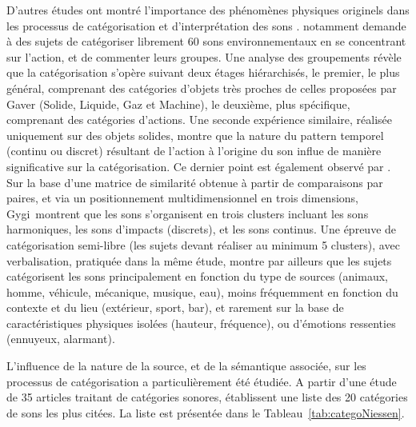 D'autres études ont montré l'importance des phénomènes physiques originels dans les processus de catégorisation et d'interprétation des sons \citep{marcell2000confrontation,lemaitre2010listener}. \citep{houix_lexical_2012} notamment demande à des sujets de catégoriser librement 60 sons environnementaux en se concentrant sur l'action, et de commenter leurs groupes. Une analyse des groupements révèle que la catégorisation s'opère suivant deux étages hiérarchisés, le premier, le plus général, comprenant des catégories d'objets très proches de celles proposées par Gaver (Solide, Liquide, Gaz et Machine), le deuxième, plus spécifique, comprenant des catégories d'actions. Une seconde expérience similaire, réalisée uniquement sur des objets solides, montre que la nature du pattern temporel (continu ou discret) résultant de l'action à l'origine du son influe de manière significative sur la catégorisation. Ce dernier point est également observé par \citep{gygi2007similarity}. Sur la base d'une matrice de similarité obtenue à partir de comparaisons par paires, et via un positionnement multidimensionnel en trois dimensions, Gygi~\al montrent que les sons s'organisent en trois clusters incluant les sons harmoniques, les sons d'impacts (discrets), et les sons continus. Une épreuve de catégorisation semi-libre (les sujets devant réaliser au minimum 5 clusters), avec verbalisation, pratiquée dans la même étude, montre par ailleurs que les sujets catégorisent les sons principalement en fonction du type de sources (animaux, homme, véhicule, mécanique, musique, eau), moins fréquemment en fonction du contexte et du lieu (extérieur, sport, bar), et rarement sur la base de caractéristiques physiques isolées (hauteur, fréquence), ou d'émotions ressenties (ennuyeux, alarmant).

L'influence de la nature de la source, et de la sémantique associée, sur les processus de catégorisation a particulièrement été étudiée. A partir d'une étude de 35 articles traitant de catégories sonores, \citep{niessen2010categories} établissent une liste des 20 catégories de sons les plus citées. La liste est présentée dans le Tableau~\ref{tab:categoNiessen}.

